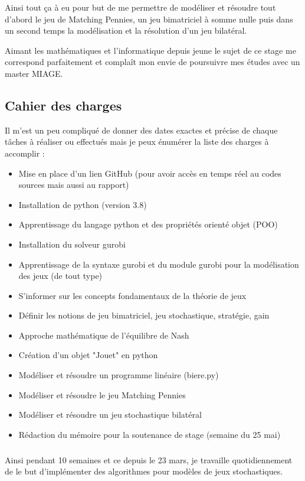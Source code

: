 \documentclass[a4paper, 12pt, twoside]{article}
\begin{document}
Ainsi tout ça à eu pour but de me permettre de modéliser et résoudre tout d'abord le jeu de \textsf{Matching Pennies}, un jeu bimatriciel à somme nulle puis dans un second temps la modélisation et la résolution d'un jeu bilatéral. \newline

Aimant les mathématiques et l'informatique depuis jeune le sujet de ce stage me correspond parfaitement et complaît mon envie de poursuivre mes études avec un master MIAGE.
\subsection{Cahier des charges}
Il m'est un peu compliqué de donner des dates exactes et précise de chaque tâches à réaliser ou effectués mais je peux énumérer la liste des charges à accomplir : \vspace{0.4 cm}
\begin{itemize}
\item Mise en place d'un lien \textsf{GitHub} (pour avoir accès en temps réel au codes sources mais aussi au rapport)
\item Installation de \textsf{python} (version 3.8)
\item Apprentissage du langage \textsf{python} et des propriétés orienté objet (POO)
\item Installation du solveur \textsf{gurobi}
\item Apprentissage de la syntaxe  \textsf{gurobi} et du module \textsf{gurobi} pour la modélisation des jeux (de tout type)
\item S'informer sur les concepts fondamentaux de la théorie de jeux
\item Définir les notions de jeu bimatriciel, jeu stochastique, stratégie, gain
\item Approche mathématique de \textsf{l'équilibre de Nash}
\item Création d'un objet "Jouet" en \textsf{python}
\item Modéliser et résoudre un programme linéaire (biere.py) 
\item Modéliser et résoudre le jeu \textsf{Matching Pennies}
\item Modéliser et résoudre un jeu \textsf{stochastique bilatéral}
\item Rédaction du mémoire pour la soutenance de stage (semaine du 25 mai)
\end{itemize} 

\subparagraph*{}{Ainsi pendant 10 semaines et ce depuis le 23 mars, je travaille quotidiennement de le but d'implémenter des algorithmes pour modèles de jeux stochastiques.}
\newpage
\end{document}
